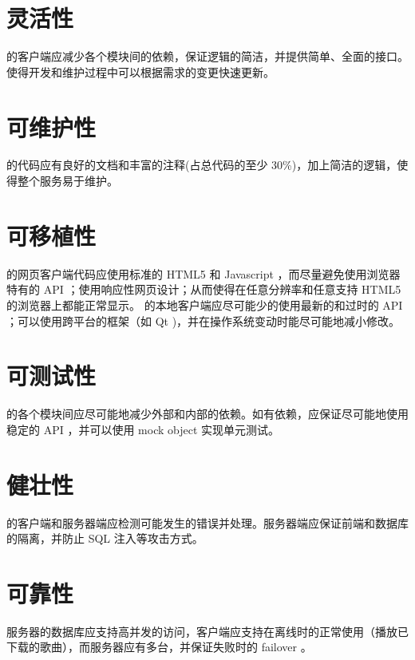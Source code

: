 \section {灵活性}
\proname 的客户端应减少各个模块间的依赖，保证逻辑的简洁，并提供简单、全面的接口。使得开发和维护过程中可以根据需求的变更快速更新。

\section {可维护性}
\proname 的代码应有良好的文档和丰富的注释(占总代码的至少 30\%)，加上简洁的逻辑，使得整个服务易于维护。

\section {可移植性}
\proname 的网页客户端代码应使用标准的 HTML5 和 Javascript ，而尽量避免使用浏览器特有的 API ；使用响应性网页设计；从而使得在任意分辨率和任意支持 HTML5 的浏览器上都能正常显示。 \proname 的本地客户端应尽可能少的使用最新的和过时的 API ；可以使用跨平台的框架（如 Qt )，并在操作系统变动时能尽可能地减小修改。

\section {可测试性}
\proname 的各个模块间应尽可能地减少外部和内部的依赖。如有依赖，应保证尽可能地使用稳定的 API ，并可以使用 mock object 实现单元测试。

\section {健壮性}
\proname 的客户端和服务器端应检测可能发生的错误并处理。服务器端应保证前端和数据库的隔离，并防止 SQL 注入等攻击方式。

\section {可靠性}
\proname 服务器的数据库应支持高并发的访问，客户端应支持在离线时的正常使用（播放已下载的歌曲），而服务器应有多台，并保证失败时的 failover 。

